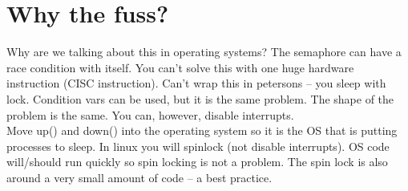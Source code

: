 \documentclass[../base_file/cs1550_notes.tex]{subfiles}
\begin{document}
\section{Why the fuss?}
Why are we talking about this in operating systems?  The semaphore can have a race condition
with itself.  You can't solve this with one huge hardware instruction (CISC instruction). Can't
wrap this in petersons -- you sleep with lock.  Condition vars can be used, but it is the same
problem.  The shape of the problem is the same. You can, however, disable interrupts.\\

Move up() and down() into the operating system so it is the OS that is putting processes to sleep.
In linux you will spinlock (not disable interrupts).  OS code will/should run quickly so spin locking
is not a problem.  The spin lock is also around a very small amount of code -- a best practice.
\end{document}

